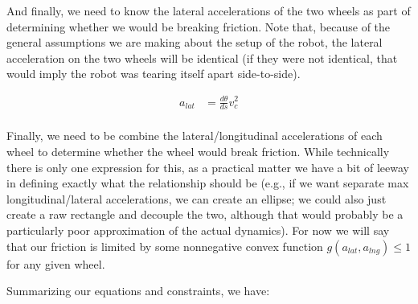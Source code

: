 \documentclass{article}
\begin{document}
And finally, we need to know the lateral accelerations of the two wheels as
part of determining whether we would be breaking friction. Note that, because of
the general assumptions we are making about the setup of the robot, the lateral
acceleration on the two wheels will be identical (if they were not identical,
that would imply the robot was tearing itself apart side-to-side).

\begin{align*}
a_{lat} &= \frac{d\theta}{ds} v_c^2 \\
\end{align*}

Finally, we need to be combine the lateral/longitudinal accelerations of each
wheel to determine whether the wheel would break friction. While technically
there is only one expression for this, as a practical matter we have a bit of
leeway in defining exactly what the relationship should be (e.g., if we want
separate max longitudinal/lateral accelerations, we can create an ellipse; we
could also just create a raw rectangle and decouple the two, although that would
probably be a particularly poor approximation of the actual dynamics). For now
we will say that our friction is limited by some nonnegative convex function
$g(a_{lat}, a_{lng}) \le 1$ for any given wheel.

Summarizing our equations and constraints, we have:
\end{document}
